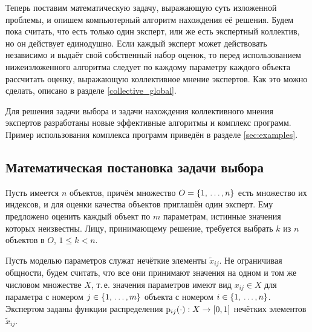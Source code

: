 
Теперь поставим математическую задачу, выражающую суть изложенной проблемы, и опишем компьютерный алгоритм нахождения её решения. Будем пока считать, что есть только один эксперт, или же есть экспертный коллектив, но он действует единодушно. Если каждый эксперт может действовать независимо и выдаёт свой собственный набор оценок, то перед использованием нижеизложенного алгоритма следует по каждому параметру каждого объекта рассчитать оценку, выражающую коллективное мнение экспертов. Как это можно сделать, описано в разделе \ref{collective_global}. 

Для решения задачи выбора и задачи нахождения коллективного мнения экспертов разработаны новые эффективные алгоритмы и комплекс программ. Пример использования комплекса программ приведён в разделе \ref{sec:examples}.

\subsection{Математическая постановка задачи выбора} %
\label{selection_task}

Пусть имеется $n$ объектов, причём множество $O = \{1, \, \ldots, n\}$ есть множество их индексов, и для оценки качества объектов приглашён один эксперт. Ему предложено оценить каждый объект по $m$ параметрам, истинные значения которых неизвестны. Лицу, принимающему решение, требуется  выбрать $k$ из $n$ объектов в $O$, $1 \leq k < n$.

Пусть моделью параметров служат нечёткие элементы $\tilde x_{ij}$. Не ограничивая общности, будем считать, что все они принимают значения на одном и том же числовом множестве $X$, т.\,е. значения параметров имеют вид $x_{ij} \in X$ для параметра с номером $j \in \{1, \, \ldots, m\}$ объекта с номером $i \in \{1, \, \ldots, n\}$. Экспертом заданы функции распределения ${\mathrm{p}}_{ij}(\cdot): X \rightarrow [0,1]$ нечётких элементов $\tilde x_{ij}$. 

